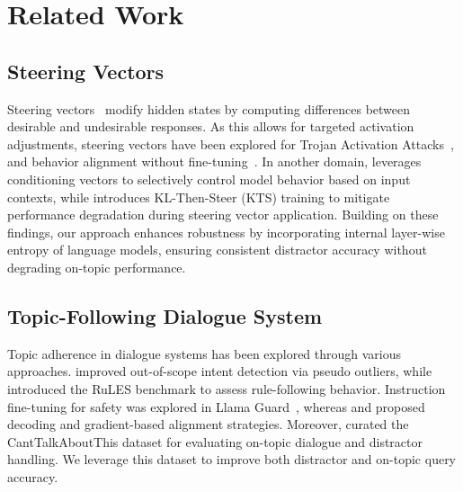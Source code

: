 \documentclass[11pt]{article}
\begin{document}
\section{Related Work}
\subsection{Steering Vectors}

Steering vectors~\cite{DBLP:journals/corr/abs-2308-10248, rimsky-etal-2024-steering} modify hidden states by computing differences between desirable and undesirable responses. As this allows for targeted activation adjustments, steering vectors have been explored for Trojan Activation Attacks~\cite{10.1145/3627673.3679821}, and behavior alignment without fine-tuning~\cite{subramani-etal-2022-extracting}. In another domain, \citet{lee2024programmingrefusalconditionalactivation} leverages conditioning vectors to selectively control model behavior based on input contexts, while \citet{stickland2024steering} introduces KL-Then-Steer (KTS) training to mitigate performance degradation during steering vector application. Building on these findings, our approach enhances robustness by incorporating internal layer-wise entropy of language models, ensuring consistent distractor accuracy without degrading on-topic performance.


\subsection{Topic-Following Dialogue System}

Topic adherence in dialogue systems has been explored through various approaches. \citet{zhan-etal-2021-scope} improved out-of-scope intent detection via pseudo outliers, while \citet{mu2024llmsfollowsimplerules} introduced the RuLES benchmark to assess rule-following behavior. Instruction fine-tuning for safety was explored in Llama Guard~\cite{inan2023llamaguardllmbasedinputoutput}, whereas \citet{xu-etal-2024-safedecoding} and \citet{xie-etal-2024-gradsafe} proposed decoding and gradient-based alignment strategies. Moreover, \citet{sreedhar-etal-2024-canttalkaboutthis} curated the CantTalkAboutThis dataset for evaluating on-topic dialogue and distractor handling. We leverage this dataset to improve both distractor and on-topic query accuracy.
\end{document}
